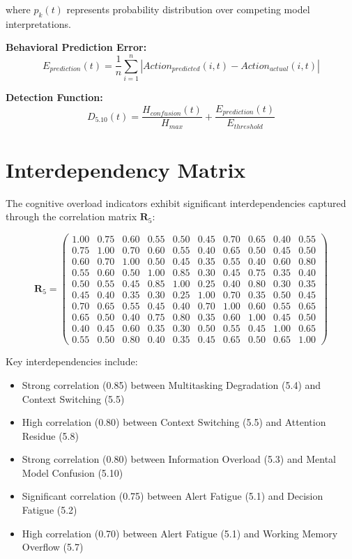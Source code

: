 \documentclass[11pt,a4paper]{article}
\begin{document}
where $p_k(t)$ represents probability distribution over competing model interpretations.

\textbf{Behavioral Prediction Error:}
\begin{equation}
E_{prediction}(t) = \frac{1}{n} \sum_{i=1}^{n} |Action_{predicted}(i,t) - Action_{actual}(i,t)|
\end{equation}

\textbf{Detection Function:}
\begin{equation}
D_{5.10}(t) = \frac{H_{confusion}(t)}{H_{max}} + \frac{E_{prediction}(t)}{E_{threshold}}
\end{equation}

\section{Interdependency Matrix}

The cognitive overload indicators exhibit significant interdependencies captured through the correlation matrix $\mathbf{R}_{5}$:

\begin{equation}
\mathbf{R}_5 = \begin{pmatrix}
1.00 & 0.75 & 0.60 & 0.55 & 0.50 & 0.45 & 0.70 & 0.65 & 0.40 & 0.55 \\
0.75 & 1.00 & 0.70 & 0.60 & 0.55 & 0.40 & 0.65 & 0.50 & 0.45 & 0.50 \\
0.60 & 0.70 & 1.00 & 0.50 & 0.45 & 0.35 & 0.55 & 0.40 & 0.60 & 0.80 \\
0.55 & 0.60 & 0.50 & 1.00 & 0.85 & 0.30 & 0.45 & 0.75 & 0.35 & 0.40 \\
0.50 & 0.55 & 0.45 & 0.85 & 1.00 & 0.25 & 0.40 & 0.80 & 0.30 & 0.35 \\
0.45 & 0.40 & 0.35 & 0.30 & 0.25 & 1.00 & 0.70 & 0.35 & 0.50 & 0.45 \\
0.70 & 0.65 & 0.55 & 0.45 & 0.40 & 0.70 & 1.00 & 0.60 & 0.55 & 0.65 \\
0.65 & 0.50 & 0.40 & 0.75 & 0.80 & 0.35 & 0.60 & 1.00 & 0.45 & 0.50 \\
0.40 & 0.45 & 0.60 & 0.35 & 0.30 & 0.50 & 0.55 & 0.45 & 1.00 & 0.65 \\
0.55 & 0.50 & 0.80 & 0.40 & 0.35 & 0.45 & 0.65 & 0.50 & 0.65 & 1.00
\end{pmatrix}
\end{equation}

Key interdependencies include:
\begin{itemize}
\item Strong correlation (0.85) between Multitasking Degradation (5.4) and Context Switching (5.5)
\item High correlation (0.80) between Context Switching (5.5) and Attention Residue (5.8)
\item Strong correlation (0.80) between Information Overload (5.3) and Mental Model Confusion (5.10)
\item Significant correlation (0.75) between Alert Fatigue (5.1) and Decision Fatigue (5.2)
\item High correlation (0.70) between Alert Fatigue (5.1) and Working Memory Overflow (5.7)
\end{itemize}
\end{document}
